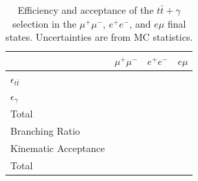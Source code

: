 \begin{table}
\begin{center}
\begin{tabular}{l|ccc}
\hline
	 & \textbf{$\mu^+\mu^-$} & \textbf{$e^+e^-$} & \textbf{$e\mu$}  \\
\hline
	$\epsilon_{t\bar{t}}$ & & &  \\
	$\epsilon_{\gamma}$ & & &  \\
	Total &  & &  \\
\hline
	Branching Ratio & & &  \\
	Kinematic Acceptance & & & \\
	Total &  &  & \\
\hline	
\end{tabular}
\end{center}
\caption{Efficiency and acceptance of the $t\bar{t}+\gamma$ selection in the $\mu^+\mu^-$, $e^+e^-$, and $e\mu$ final states. Uncertainties are from MC statistics.}
\label{tab-efficiencyAndAcceptance}
\end{table}	